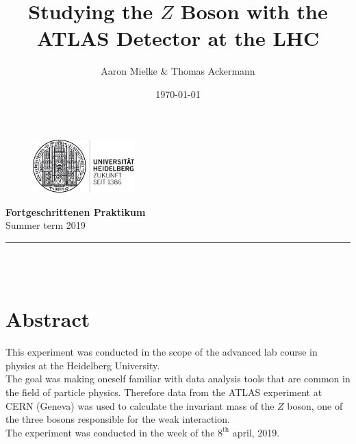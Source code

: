 \documentclass[12pt, a4paper, bibliography=totoc]{scrartcl}
\title{Studying the $Z$ Boson with the ATLAS Detector at the LHC}
\author{Aaron Mielke \& Thomas Ackermann}
\date{\today}
\begin{document}
\begin{center}
	\makeatletter
	\thispagestyle{empty}
	
	\begin{figure}[H]
	\flushright
	\includegraphics[width=0.35\textwidth]{fig/logo}
	\end{figure}
	
	\vspace{-30mm}
	
	\begin{flushleft}
	\large{\textbf{Fortgeschrittenen Praktikum} \\
		Summer term 2019} \\
	\end{flushleft}
	
	\vspace{5mm}
	
	\rule{\textwidth}{0.2pt}

	\vspace{50mm}
	\Huge\textbf{\@title} \\
	\vspace{10mm}
	\large{\@author} \\
	\normalfont
	
	\vspace{2mm}
	
	\makeatother
\end{center}

\normalsize
\newpage

\section*{Abstract}
This experiment was conducted in the scope of the advanced lab course in physics at the Heidelberg University. \\
The goal was making oneself familiar with data analysis tools that are common in the field of particle physics.
Therefore data from the ATLAS experiment at CERN (Geneva) was used to calculate the invariant mass of the $Z$ boson, one of the three bosons responsible for the weak interaction. \\
The experiment was conducted in the week of the $8^\text{th}$ april, 2019.
\end{document}
